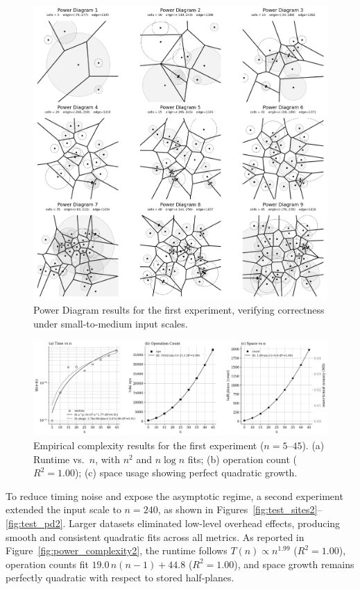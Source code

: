 \documentclass{article}
\begin{document}
\begin{figure}[H]
    \centering
    \includegraphics[width=0.95\linewidth]{Pictures/test_pd1.png}
    \caption{Power Diagram results for the first experiment, verifying correctness under small-to-medium input scales.}
    \label{fig:test_pd1}
\end{figure}

\begin{figure}[H]
    \centering
    \includegraphics[width=0.95\linewidth]{Pictures/power_complexity1.png}
    \caption{Empirical complexity results for the first experiment ($n=5$–$45$). 
    (a) Runtime vs.~$n$, with $n^2$ and $n\log n$ fits; 
    (b) operation count ($R^2\!=\!1.00$); 
    (c) space usage showing perfect quadratic growth.}
    \label{fig:power_complexity1}
\end{figure}

To reduce timing noise and expose the asymptotic regime, a second experiment extended the input scale to $n=240$, as shown in Figures~\ref{fig:test_sites2}–\ref{fig:test_pd2}.  
Larger datasets eliminated low-level overhead effects, producing smooth and consistent quadratic fits across all metrics.  
As reported in Figure~\ref{fig:power_complexity2}, the runtime follows $T(n)\!\propto\!n^{1.99}$ ($R^2\!=\!1.00$), operation counts fit $19.0\,n(n-1)+44.8$ ($R^2\!=\!1.00$), and space growth remains perfectly quadratic with respect to stored half-planes.
\end{document}
